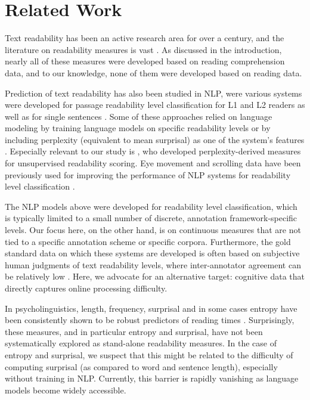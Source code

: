 \section{Related Work}
Text readability has been an active research area for over a century, and the literature on readability measures is vast \cite[see][for surveys]{chall1958,crossley2011text,collins2014computational}.
As discussed in the introduction, nearly all of these measures were developed based on reading comprehension data, and to our knowledge, none of them were developed based on reading data. 

Prediction of text readability has also been studied in NLP, were various systems were developed for passage readability level classification for L1 and L2 readers \citep[][among others]{heilman2007combining,pitler2008revisiting,kate2010learning,vajjala2012improving,filighera2019automatic,feng2010comparison,vajjala-2018-onestopenglish,arase-etal-2022-cefr} as well as for single sentences \citep{vstajner2017automatic,brunato2018sentence,liu2025automatic}. Some of these approaches relied on language modeling by training language models on specific readability levels \cite{si2001statistical,collins2004language,schwarm2005reading} or by including perplexity (equivalent to mean surprisal) as one of the system's features \cite{xia2019text}. Especially relevant to our study is \citet{martinc2021supervised}, who developed perplexity-derived measures for unsupervised readability scoring. Eye movement and scrolling data have been previously used for improving the performance of NLP systems for readability level classification \cite{gonzalez2018learning,gooding2021predicting}. 

The NLP models above were developed for readability level classification, which is typically limited to a small number of discrete, annotation framework-specific levels. Our focus here, on the other hand, is on continuous measures that are not tied to a specific annotation scheme or specific corpora. 
Furthermore, the gold standard data on which these systems are developed is often based on subjective human judgments of text readability levels, where inter-annotator agreement can be relatively low \citep{brunato2018sentence}. Here,  we advocate for an alternative target: cognitive data that directly captures online processing difficulty.

In psycholinguistics, length, frequency, surprisal and in some cases entropy have been consistently shown to be robust predictors of reading times \citep[][among others]{rayner1998,rayner2004,kliegl2004,rayner2011,smith2013}. Surprisingly, these measures, and in particular entropy and surprisal, have not been systematically explored as stand-alone readability measures. In the case of entropy and surprisal, we suspect that this might be related to the difficulty of computing surprisal (as compared to word and sentence length), especially without training in NLP. Currently, this barrier is rapidly vanishing as language models become widely accessible.

